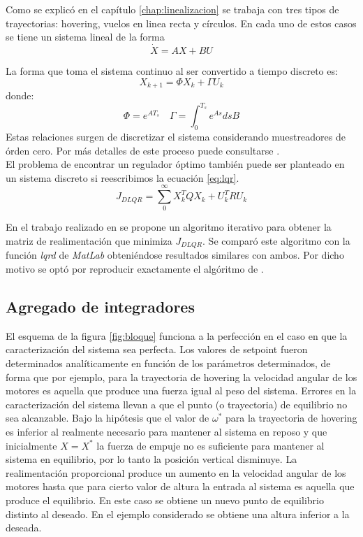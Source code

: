 \documentclass[main]{subfiles}
\begin{document}
Como se explic\'o en el cap\'itulo \ref{chap:linealizacion} se trabaja con tres tipos de trayectorias: hovering, vuelos en linea recta y c\'irculos. En cada uno de estos casos se tiene un sistema lineal de la forma 
\begin{equation}
\dot{X} = A X + BU
\end{equation}
 
La forma que toma el sistema continuo al ser convertido a tiempo discreto es: 
\begin{equation}
X_{k+1} = \Phi X_k + \Gamma U_k
\end{equation}
donde:
\begin{equation}
\Phi = e^{AT_s} \quad \Gamma = \int_0^{T_s} e^{A s} ds B
\end{equation}
Estas relaciones surgen de discretizar el sistema considerando muestreadores de \'orden cero. Por m\'as detalles de este proceso puede consultarse \cite{bib:hakas}.\\

El problema de encontrar un regulador \'optimo tambi\'en puede ser planteado en un sistema discreto si reescribimos la ecuaci\'on \ref{eq:lqr}. 
\begin{equation}
\label{eq:dlqr}
J_{DLQR} = \sum_0^\infty X_k^T Q X_k + U_k^T R U_k
\end{equation}

En el trabajo realizado en \cite{bib:lqr-discreto} se propone un algoritmo iterativo para obtener la matriz de realimentaci\'on que minimiza $J_{DLQR}$. Se compar\'o este algoritmo con la funci\'on \emph{lqrd} de \emph{MatLab} obteni\'endose resultados similares con ambos. Por dicho motivo se opt\'o por reproducir exactamente el alg\'oritmo de \cite{bib:lqr-discreto}.

\subsection{Agregado de integradores}

El esquema de la figura \ref{fig:bloque} funciona a la perfecci\'on en el caso en que la caracterizaci\'on del sistema sea perfecta. Los valores de setpoint fueron determinados anal\'iticamente en funci\'on de los par\'ametros determinados, de forma que por ejemplo, para la trayectoria de hovering la velocidad angular de los motores es aquella que produce una fuerza igual al peso del sistema. Errores en la caracterizaci\'on del sistema llevan a que el punto (o trayectoria) de equilibrio no sea alcanzable. Bajo la hip\'otesis que el valor de $\omega^*$ para la trayectoria de hovering es inferior al realmente necesario para mantener al sistema en reposo y que inicialmente $X = X^*$ la fuerza de empuje no es suficiente para mantener al sistema en equilibrio, por lo tanto la posici\'on vertical disminuye. La realimentaci\'on proporcional produce un aumento en la velocidad angular de los motores hasta que para cierto valor de altura la entrada al sistema es aquella que produce el equilibrio. En este caso se obtiene un nuevo punto de equilibrio distinto al deseado. En el ejemplo considerado se obtiene una altura inferior a la deseada. \\
\end{document}
